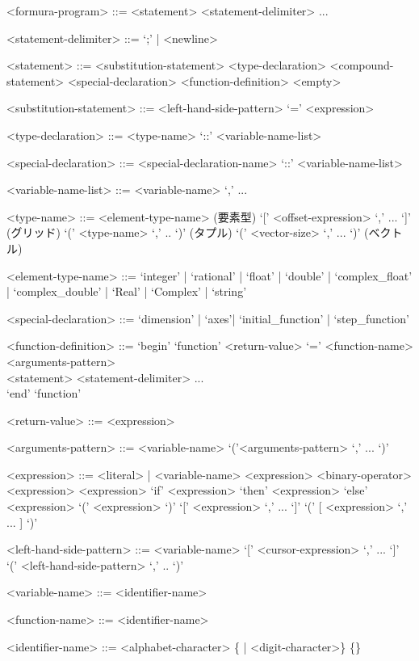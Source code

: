 \documentclass{jsarticle}
\begin{document}
\begin{grammar}
<formura-program> ::= <statement> <statement-delimiter> ...

<statement-delimiter> ::= `;' | <newline>

  <statement> ::= <substitution-statement> \alt
  <type-declaration> \alt
  <compound-statement> \alt
  <special-declaration> \alt
  <function-definition> \alt
 <empty>

 <substitution-statement> ::= <left-hand-side-pattern> `=' <expression>

 <type-declaration> ::= <type-name> `::' <variable-name-list>

 <special-declaration> ::= <special-declaration-name> `::' <variable-name-list>

 <variable-name-list> ::= <variable-name> `,' ...

<type-name> ::= <element-type-name>                  \hfill {(要素型)}
 `[' <offset-expression> `,' ... `]' \hfill {(グリッド)}
\alt `(' <type-name> `,' .. `)'                      \hfill {(タプル)}
 `(' <vector-size> `,' ... `)'                   \hfill {(ベクトル)}

<element-type-name> ::= `integer' | `rational' | `float' | `double'
| `complex_float' | `complex_double'
| `Real' | `Complex' | `string'

<special-declaration> ::= `dimension' | `axes'| `initial_function' |  `step_function'

<function-definition> ::=
  `begin' `function' <return-value> `=' <function-name> <arguments-pattern> \\
\hspace{2em}<statement> <statement-delimiter> ...  \\
    `end' `function'

<return-value> ::= <expression>

<arguments-pattern>     ::= <variable-name>
                         \alt  `('<arguments-pattern>  `,' ... `)'


<expression> ::= <literal> | <variable-name>
\alt <expression> <binary-operator> <expression>
 <expression>
\alt `if' <expression> `then' <expression> `else' <expression>
\alt  `('  <expression>  `)'
 `[' <expression> `,' ... `]'
 `(' [ <expression> `,' ... ] `)'


  <left-hand-side-pattern> ::= <variable-name>
   `[' <cursor-expression> `,' ... `]'
  \alt `(' <left-hand-side-pattern> `,' .. `)'

<variable-name> ::= <identifier-name>

<function-name> ::= <identifier-name>

<identifier-name> ::= <alphabet-character> \{<alphabet-character> | <digit-character>\}
   \{<other-character>\}

\end{grammar}
\end{document}
